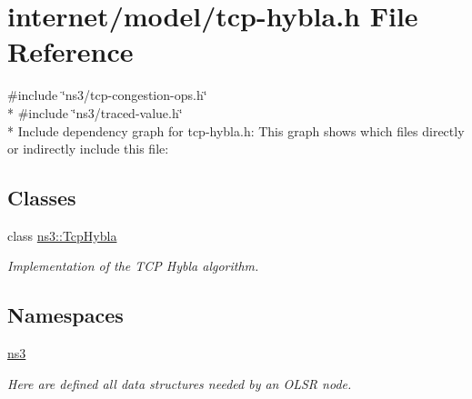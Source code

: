 \hypertarget{tcp-hybla_8h}{}\section{internet/model/tcp-\/hybla.h File Reference}
\label{tcp-hybla_8h}
{\ttfamily \#include \char`\"{}ns3/tcp-\/congestion-\/ops.\+h\char`\"{}}\\*
{\ttfamily \#include \char`\"{}ns3/traced-\/value.\+h\char`\"{}}\\*
Include dependency graph for tcp-\/hybla.h\+:
This graph shows which files directly or indirectly include this file\+:
\subsection*{Classes}
\begin{DoxyCompactItemize}
\item 
class \hyperlink{classns3_1_1TcpHybla}{ns3\+::\+Tcp\+Hybla}
\begin{DoxyCompactList}\small\item\em Implementation of the T\+CP Hybla algorithm. \end{DoxyCompactList}\end{DoxyCompactItemize}
\subsection*{Namespaces}
\begin{DoxyCompactItemize}
\item 
 \hyperlink{namespacens3}{ns3}
\begin{DoxyCompactList}\small\item\em Here are defined all data structures needed by an O\+L\+SR node. \end{DoxyCompactList}\end{DoxyCompactItemize}
